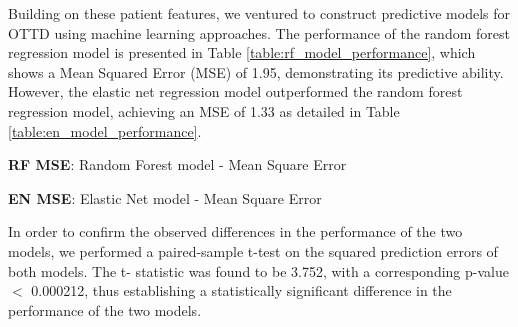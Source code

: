 \documentclass[11pt]{article}
\begin{document}
Building on these patient features, we ventured to construct predictive models for OTTD using machine learning approaches. The performance of the random forest regression model is presented in Table {}\ref{table:rf_model_performance}, which shows a Mean Squared Error (MSE) of 1.95, demonstrating its predictive ability. However, the elastic net regression model outperformed the random forest regression model, achieving an MSE of 1.33 as detailed in Table {}\ref{table:en_model_performance}. 

\begin{table}[h]
\caption{Random Forest Model Performance: Mean Square Error}
\label{table:rf_model_performance}
\begin{threeparttable}
\renewcommand{\TPTminimum}{\linewidth}
\begin{tablenotes}
\footnotesize
\item \textbf{RF MSE}: Random Forest model - Mean Square Error
\end{tablenotes}
\end{threeparttable}
\end{table}


\begin{table}[h]
\caption{Elastic Net Model Performance: Mean Square Error}
\label{table:en_model_performance}
\begin{threeparttable}
\renewcommand{\TPTminimum}{\linewidth}
\begin{tablenotes}
\footnotesize
\item \textbf{EN MSE}: Elastic Net model - Mean Square Error
\end{tablenotes}
\end{threeparttable}
\end{table}


In order to confirm the observed differences in the performance of the two models, we performed a paired-sample t-test on the squared prediction errors of both models. The t- statistic was found to be 3.752, with a corresponding p-value $<$ 0.000212, thus establishing a statistically significant difference in the performance of the two models. 
\end{document}
